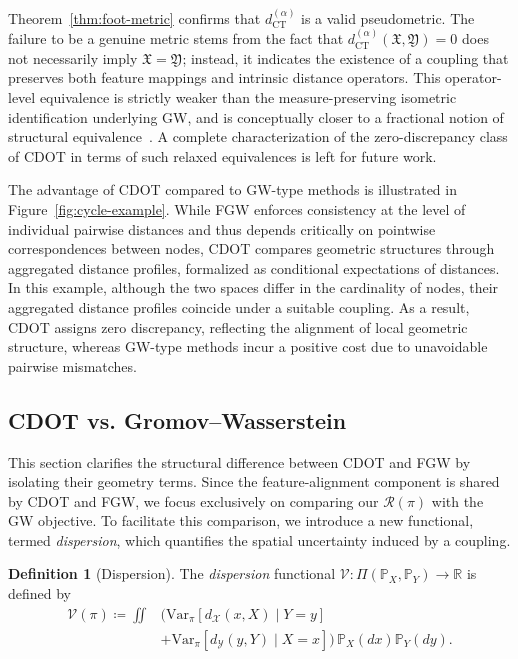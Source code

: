 \documentclass{article}
\theoremstyle{plain}
\theoremstyle{definition}
\newtheorem{definition}[theorem]{Definition}
\theoremstyle{remark}
\begin{document}
Theorem~\ref{thm:foot-metric} confirms that $d_{\mathrm{CT}}^{(\alpha)}$ is a valid pseudometric. The failure to be a genuine metric stems from the fact that $d_{\mathrm{CT}}^{(\alpha)}(\mathfrak{X},\mathfrak{Y}) = 0$ does not necessarily imply $\mathfrak{X} = \mathfrak{Y}$; instead, it indicates the existence of a coupling that preserves both feature mappings and intrinsic distance operators. This operator-level equivalence is strictly weaker than the measure-preserving isometric identification underlying GW, and is conceptually closer to a fractional notion of structural equivalence~\citep{grebik2022fractional}. A complete characterization of the zero-discrepancy class of CDOT in terms of such relaxed equivalences is left for future work.

The advantage of CDOT compared to GW-type methods is illustrated in Figure~\ref{fig:cycle-example}. While FGW enforces consistency at the level of individual pairwise distances and thus depends critically on pointwise correspondences between nodes, CDOT compares geometric structures through aggregated distance profiles, formalized as conditional expectations of distances. In this example, although the two spaces differ in the cardinality of nodes, their aggregated distance profiles coincide under a suitable coupling. As a result, CDOT assigns zero discrepancy, reflecting the alignment of local geometric structure, whereas GW-type methods incur a positive cost due to unavoidable pairwise mismatches.

\subsection{CDOT vs. Gromov--Wasserstein}\label{sec:relation-to-GW}

This section clarifies the structural difference between CDOT and FGW by isolating their geometry terms. Since the feature-alignment component is shared by CDOT and FGW, we focus exclusively on comparing our $\mathcal{R}(\pi)$ with the GW objective. To facilitate this comparison, we introduce a new functional, termed \emph{dispersion}, which quantifies the spatial uncertainty induced by a coupling.

\begin{definition}[Dispersion]
	\label{def:dispersion}
	The \emph{dispersion} functional $\mathcal{V} : \Pi(\mathbb{P}_X,\mathbb{P}_Y) \to \mathbb{R}$ is defined by
	\begin{align*}
		\mathcal{V}(\pi) \coloneqq \iint &\Big(\mathrm{Var}_{\pi}[d_{\mathcal{X}}(x,X) \mid Y=y] \\
		&+ \mathrm{Var}_{\pi}[d_{\mathcal{Y}}(y,Y) \mid X=x] \Big) \,\mathbb{P}_X(dx)\mathbb{P}_Y(dy).
	\end{align*}
\end{definition}
\end{document}
